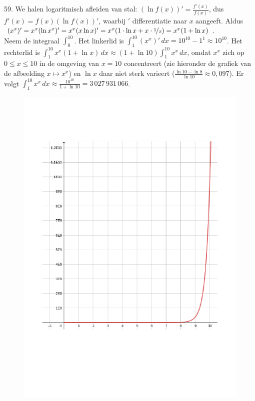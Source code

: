 \begin{problem}{59.}
	We halen logaritmisch afleiden van stal: $(\ln f(x))' = \frac{f'(x)}{f(x)}$, dus $f'(x) = f(x) (\ln f(x))'$, waarbij $'$ differentiatie naar $x$ aangeeft. Aldus $(x^x)' = x^x (\ln x^x)' = x^x (x \ln x)' = x^x (1 \cdot \ln x + x \cdot \nicefrac{1}{x}) = x^x (1 + \ln x)$.\\Neem de integraal $\int_{0}^{10}$. Het linkerlid is $\int_{1}^{10} (x^x)'\,dx = {10}^{10} - 1^1 \approx {10}^{10}$. Het rechterlid is $\int_{1}^{10} x^x (1 + \ln x)\,dx \approx (1 + \ln 10) \int_{1}^{10} x^x\,dx$, omdat $x^x$ zich op $0 \leq x \leq 10$ in de omgeving van $x = 10$ concentreert (zie hieronder de grafiek van de afbeelding $x \mapsto x^x$) en $\ln x$ daar niet sterk varieert ($\frac{\ln 10 - \ln 8}{\ln 10} \approx 0{,}097$). Er volgt $\int_{1}^{10} x^x\,dx \approx \frac{{10}^{10}}{1 + \ln 10} = 3\,027\,931\,066$.
    \begin{figure}
		\includegraphics{resources/oplossing59}
	\end{figure}
\end{problem}

